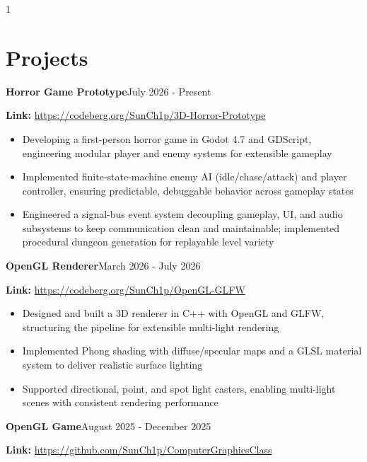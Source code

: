 \documentclass[11pt]{article}
\newcommand{\project}[4]{
    \noindent \textbf{#1}\normalsize \hfill #2
    \par
    \noindent #3
    #4
}
\begin{document}
\begin{spacing}{1}
        \section*{\Large \textbf{Projects}}
        \normalsize
        \project{Horror Game Prototype}{July 2026 - Present}{\textbf{Link:} \url{https://codeberg.org/SunCh1p/3D-Horror-Prototype}}
        {
            \begin{itemize}
                \setlength\itemsep{2pt}
                \setlength{\parsep}{0pt}
                \setlength{\parskip}{0pt}
                \item Developing a first-person horror game in Godot 4.7 and GDScript, engineering modular player and enemy systems for extensible gameplay
                \item Implemented finite-state-machine enemy AI (idle/chase/attack) and player controller, ensuring predictable, debuggable behavior across gameplay states
                \item Engineered a signal-bus event system decoupling gameplay, UI, and audio subsystems to keep communication clean and maintainable; implemented procedural dungeon generation for replayable level variety
            \end{itemize}
            \par
        }
        \project{OpenGL Renderer}{March 2026 - July 2026}{\textbf{Link:} \url{https://codeberg.org/SunCh1p/OpenGL-GLFW}}
        {
            \begin{itemize}
                \setlength\itemsep{2pt}
                \setlength{\parsep}{0pt}
                \setlength{\parskip}{0pt}
                \item Designed and built a 3D renderer in C++ with OpenGL and GLFW, structuring the pipeline for extensible multi-light rendering
                \item Implemented Phong shading with diffuse/specular maps and a GLSL material system to deliver realistic surface lighting
                \item Supported directional, point, and spot light casters, enabling multi-light scenes with consistent rendering performance
            \end{itemize}
            \par
        }
        \project{OpenGL Game}{August 2025 - December 2025}{\textbf{Link:} \url{https://github.com/SunCh1p/ComputerGraphicsClass}}
        {
            \begin{itemize}
                \setlength\itemsep{2pt}

\end{itemize}}
\end{spacing}
\end{document}
